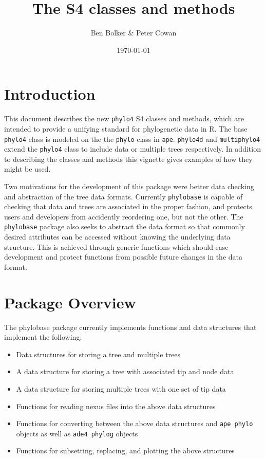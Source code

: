 \documentclass{article}
\title{The \code{phylo4} S4 classes and methods}
\author{Ben Bolker \& Peter Cowan}
\date{\today}
\newcommand{\code}[1]{{{\tt #1}}}
\begin{document}
\maketitle
\tableofcontents

\section{Introduction}

This document describes the new \code{phylo4} S4 classes and methods, which are intended to provide a unifying standard for phylogenetic data in R.  The base \code{phylo4} class is modeled on the the \code{phylo} class in \code{ape}.  \code{phylo4d} and \code{multiphylo4} extend the \code{phylo4} class to include data or multiple trees respectively.  In addition to describing the classes and methods this vignette gives examples of how they might be used.

Two motivations for the development of this package were better data checking and abstraction of the tree data formats.  Currently \code{phylobase} is capable of checking that data and trees are associated in the proper fashion, and protects users and developers from accidently reordering one, but not the other.  The \code{phylobase} package also seeks to abstract the data format so that commonly desired attributes can be accessed without knowing the underlying data structure.  This is achieved through generic functions which should ease development and protect functions from possible future changes in the data format.

\section{Package Overview}

The phylobase package currently implements functions and data structures that implement the following:

\begin{itemize}
  \item Data structures for storing a tree and multiple trees
  \item A data structure for storing a tree with associated tip and node data
  \item A data structure for storing multiple trees with one set of tip data
  \item Functions for reading nexus files into the above data structures
  \item Functions for converting between the above data structures and \code{ape phylo} objects as well as \code{ade4 phylog} objects
  \item Functions for subsetting, replacing, and plotting the above structures
\end{itemize}
\end{document}

